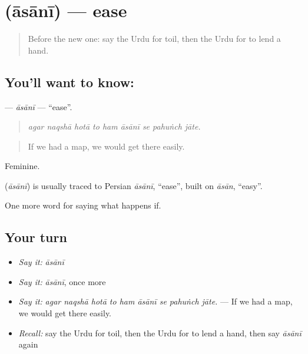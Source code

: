 \section[\texorpdfstring{\ur{آسانی} (āsānī)}{آسانی (āsānī)}]{ (āsānī) — ease}

\label{lesson:UR-C546-asani}



\begin{quote}
Before the new one: say the Urdu for toil, then the Urdu for to lend a hand.
\end{quote}

\subsection*{You'll want to know: }
\textbf{} — \emph{āsānī} — \textquotedblleft{}ease\textquotedblright{}.

\begin{quote}
        
\end{quote}

\begin{quote}
\emph{agar naqshā hotā to ham āsānī se pahuṅch jāte.}
\end{quote}

\begin{quote}
If we had a map, we would get there easily.
\end{quote}

Feminine.

\begin{cousinweb}
\textbf{} (\emph{āsānī}) is usually traced to Persian \emph{āsānī}, \textquotedblleft{}ease\textquotedblright{}, built on \emph{āsān}, \textquotedblleft{}easy\textquotedblright{}.
\end{cousinweb}

\begin{grammarlens}[title={What you've built}]
One more word for saying what happens if.
\end{grammarlens}

\subsection*{Your turn}
\begin{itemize}
\raggedright
  \item \emph{Say it:} \emph{āsānī}
  \item \emph{Say it:} \emph{āsānī}, once more
  \item \emph{Say it:} \emph{agar naqshā hotā to ham āsānī se pahuṅch jāte.} — If we had a map, we would get there easily.
  \item \emph{Recall:} say the Urdu for toil, then the Urdu for to lend a hand, then say \emph{āsānī} again
\end{itemize}

